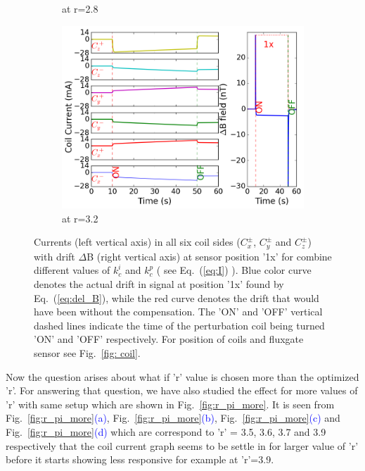 \begin{figure}[!htb]
\begin{subfigure}{.5\linewidth}
        \caption{at r=2.8}
        \label{fig:r28}
    \end{subfigure}%
        \begin{subfigure}{.5\linewidth}
        \centering
        \includegraphics[width=\linewidth, height= 6.5 cm]{Images/r32}
        \caption{at r=3.2}
        \label{fig:r32}
    \end{subfigure}


    \caption{Currents (left vertical axis) in all six coil sides ($C_x^\pm$, $C_y^\pm$ and $C_z^\pm$) with drift $\Delta$B (right vertical axis) at sensor position '1x' for combine different values of $k_c^i$ and $k_c^p$ ( see Eq.~(\ref{eq:I}) ). Blue color curve denotes the actual drift in signal at position '1x' found by Eq.~(\ref{eq:del_B}), while the red curve denotes the drift that would have been without the compensation. The 'ON' and 'OFF' vertical dashed lines indicate the time of the perturbation coil being turned 'ON' and 'OFF' respectively. For position of coils and fluxgate sensor see Fig.~\ref{fig: coil}.}
    \label{fig:r_pi}
\end{figure}

\FloatBarrier
Now the question arises about what if 'r' value is chosen more than the optimized 'r'. For answering that question, we have also studied the effect for more values of 'r' with same setup which are shown in Fig.~\ref{fig:r_pi_more}. It is seen from Fig.~\ref{fig:r_pi_more}\textcolor{blue}{(a)}, Fig.~\ref{fig:r_pi_more}\textcolor{blue}{(b)}, Fig.~\ref{fig:r_pi_more}\textcolor{blue}{(c)} and Fig.~\ref{fig:r_pi_more}\textcolor{blue}{(d)} which are correspond to 'r' = 3.5, 3.6, 3.7 and 3.9 respectively that the coil current graph seems to be settle in for larger value of 'r' before it starts showing less responsive for example at 'r'=3.9.   


